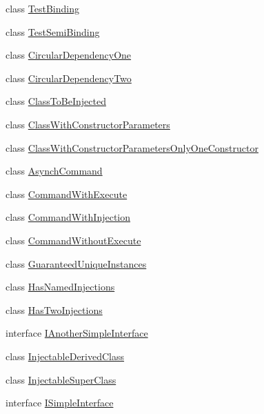 \begin{DoxyCompactItemize}
\item 
class \hyperlink{classstrange_1_1unittests_1_1_test_binding}{Test\-Binding}
\item 
class \hyperlink{classstrange_1_1unittests_1_1_test_semi_binding}{Test\-Semi\-Binding}
\item 
class \hyperlink{classstrange_1_1unittests_1_1_circular_dependency_one}{Circular\-Dependency\-One}
\item 
class \hyperlink{classstrange_1_1unittests_1_1_circular_dependency_two}{Circular\-Dependency\-Two}
\item 
class \hyperlink{classstrange_1_1unittests_1_1_class_to_be_injected}{Class\-To\-Be\-Injected}
\item 
class \hyperlink{classstrange_1_1unittests_1_1_class_with_constructor_parameters}{Class\-With\-Constructor\-Parameters}
\item 
class \hyperlink{classstrange_1_1unittests_1_1_class_with_constructor_parameters_only_one_constructor}{Class\-With\-Constructor\-Parameters\-Only\-One\-Constructor}
\item 
class \hyperlink{classstrange_1_1unittests_1_1_asynch_command}{Asynch\-Command}
\item 
class \hyperlink{classstrange_1_1unittests_1_1_command_with_execute}{Command\-With\-Execute}
\item 
class \hyperlink{classstrange_1_1unittests_1_1_command_with_injection}{Command\-With\-Injection}
\item 
class \hyperlink{classstrange_1_1unittests_1_1_command_without_execute}{Command\-Without\-Execute}
\item 
class \hyperlink{classstrange_1_1unittests_1_1_guaranteed_unique_instances}{Guaranteed\-Unique\-Instances}
\item 
class \hyperlink{classstrange_1_1unittests_1_1_has_named_injections}{Has\-Named\-Injections}
\item 
class \hyperlink{classstrange_1_1unittests_1_1_has_two_injections}{Has\-Two\-Injections}
\item 
interface \hyperlink{interfacestrange_1_1unittests_1_1_i_another_simple_interface}{I\-Another\-Simple\-Interface}
\item 
class \hyperlink{classstrange_1_1unittests_1_1_injectable_derived_class}{Injectable\-Derived\-Class}
\item 
class \hyperlink{classstrange_1_1unittests_1_1_injectable_super_class}{Injectable\-Super\-Class}
\item 
interface \hyperlink{interfacestrange_1_1unittests_1_1_i_simple_interface}{I\-Simple\-Interface}

\end{DoxyCompactItemize}
